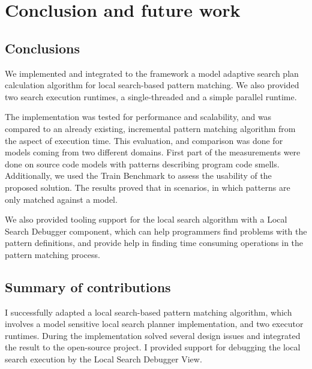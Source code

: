 \chapter{Conclusion and future work}
\label{chap:conclusion}



\section{Conclusions}


We implemented and integrated to the \eiq framework a model adaptive search plan calculation algorithm for local search-based pattern matching. We also provided two search execution runtimes, a single-threaded and a simple parallel runtime. 

The implementation was tested for performance and scalability, and was compared to an already existing, incremental pattern matching algorithm from the aspect of execution time. This evaluation, and comparison was done for models coming from two different domains. First part of the measurements were done on source code models with patterns describing program code smells. Additionally, we used the Train Benchmark to assess the usability of the proposed solution. The results proved that in scenarios, in which patterns are only matched against a model.

We also provided tooling support for the local search algorithm with a Local Search Debugger component, which can help programmers find problems with the pattern definitions, and provide help in finding time consuming operations in the pattern matching process.

\section{Summary of contributions}

I successfully adapted a local search-based pattern matching algorithm, which involves a model sensitive local search planner implementation, and two executor runtimes. During the implementation solved several design issues and integrated the result to the open-source \eiq project. I provided support for debugging the local search execution by the Local Search Debugger View. 


